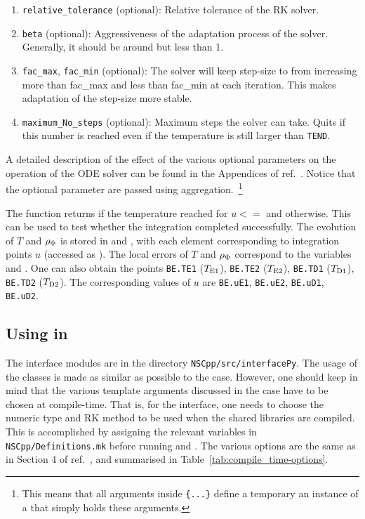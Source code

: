 \documentclass[11pt,a4paper]{article}
\begin{document}
\begin{enumerate}
	\item {\tt relative\_tolerance} (optional): Relative tolerance of the RK solver.
	
	\item {\tt beta} (optional): Aggressiveness of the adaptation process of the solver. Generally, it should be around but less than 1.
	
	\item {\tt fac\_max},  {\tt fac\_min} (optional): The solver will keep step-size to from increasing more than fac\_max and less than fac\_min at each iteration. This makes adaptation of the step-size more stable.
	
	\item {\tt maximum\_No\_steps} (optional): Maximum steps the solver can take. Quits if this number is reached even if the temperature is still larger than {\tt TEND}. 
\end{enumerate}
%
A detailed description of the  effect of the various optional parameters on the operation of the ODE solver can be found in the Appendices of ref.~\cite{Karamitros:2021nxi}. Notice that the optional parameter are passed using aggregation.~\footnote{This means that all arguments inside {\tt \{...\}} define a temporary an instance of a  that simply holds these arguments.} 


The  function returns  if the temperature reached  for $u<=$ and  otherwise. This can be used to test whether the integration completed successfully.
%
The evolution of $T$ and $\rho_{\Phi}$ is stored in  and , with each element corresponding to integration points $u$ (accessed as ). The local errors of $T$ and $\rho_{\Phi}$ correspond to the variables  and . 
%
One can also obtain the points {\tt BE.TE1} ($T_{\rm E1}{}$), {\tt BE.TE2} ($T_{\rm E2}{}$), {\tt BE.TD1} ($T_{\rm D1}{}$), {\tt BE.TD2} ($T_{\rm D2}{}$). The corresponding values of $u$ are {\tt BE.uE1}, {\tt BE.uE2}, {\tt BE.uD1}, {\tt BE.uD2}.

\subsection{Using \nsc in \PY}\label{sec:py_usage}
%
The \PY interface modules are in the directory {\tt NSCpp/src/interfacePy}. The usage of the classes is made as similar as possible to the \CPP case. However, one should keep in mind that the various template arguments discussed in the \CPP case have to be chosen at compile-time. That is, for the \PY interface, one needs to choose the numeric type and RK method to be used when the shared libraries are compiled. This is accomplished by assigning the relevant variables in {\tt NSCpp/Definitions.mk} before running  and . The various options are the same as in Section 4 of ref.~\cite{Karamitros:2021nxi}, and summarised in Table~\ref{tab:compile_time-options}.
\end{document}
